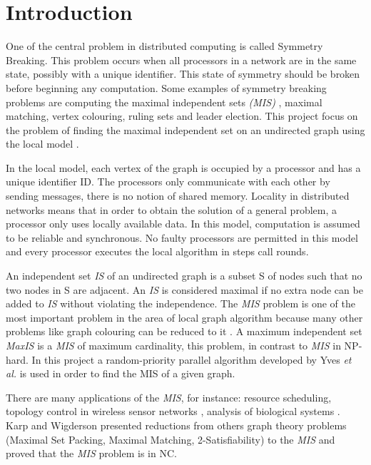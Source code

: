 \section{Introduction}
\label{cap:1}

One of the central problem in distributed computing is called Symmetry Breaking. This problem occurs when all processors in a network are in the same state, possibly with a unique identifier. This state of symmetry should be broken before beginning any computation. Some examples of symmetry breaking problems are computing the maximal independent sets \textit{(MIS)} , maximal matching, vertex colouring, ruling sets and leader election. This project focus on the problem of finding the maximal independent set on an undirected graph using the local model \cite{linial1992locality}.

In the local model, each vertex of the graph is occupied by a processor and has a unique identifier ID. The processors only communicate with each other by sending messages, there is no notion of shared memory. Locality in distributed networks means that in order to obtain the solution of a general problem, a processor only uses locally available data. In this model, computation is assumed to be reliable and synchronous. No faulty processors are permitted in this model and every processor executes the local algorithm in steps call rounds. 

An independent set \textit{IS} of an undirected graph is a subset S of nodes such that no two nodes in S are adjacent. An \textit{IS} is considered maximal if no extra node can be added to \textit{IS} without violating the independence. The \textit{MIS} problem is one of the most important problem in the area of local graph algorithm because many other problems like graph colouring can be reduced to it \cite{panconesi1992improved}. A maximum independent set \textit{MaxIS} is a \textit{MIS} of maximum cardinality, this problem, in contrast to \textit{MIS} in NP-hard. In this project a random-priority parallel algorithm developed by Yves \textit{et al.} \cite{yves2009optimal} is used in order to find the MIS of a given graph.


There are many applications of the \textit{MIS}, for instance: resource scheduling, topology control in wireless sensor networks \cite{basagni2001finding}, analysis of biological systems \cite{afek2013beeping}. Karp and Wigderson \cite{karp1986constructing} presented reductions from others graph theory problems (Maximal Set Packing, Maximal Matching, 2-Satisfiability) to the \textit{MIS} and proved that the \textit{MIS} problem is in NC.


